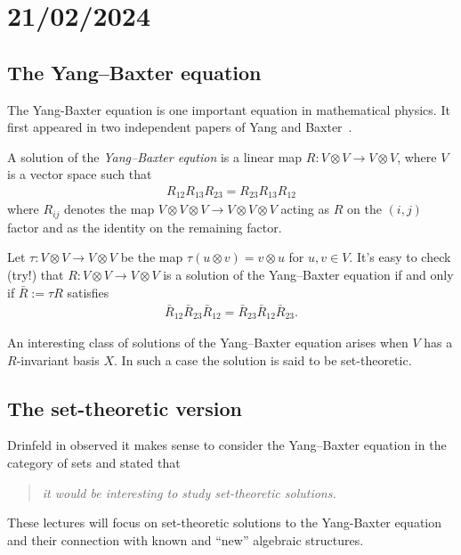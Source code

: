 \section{21/02/2024}

\subsection{The Yang--Baxter equation}
The Yang-Baxter equation is one important equation in mathematical physics.
It first appeared in two independent papers of Yang \cite{Yang1967} and Baxter\
\cite{Baxter1971}.

\begin{definition}
    A solution of the \emph{Yang--Baxter eqution} is a linear map  $R: V\otimes V \to V \otimes V$, where $V$ is a vector space such that
    \begin{align*}
        R_{12}R_{13}R_{23} = R_{23}R_{13}R_{12}
    \end{align*}
    where $R_{ij}$ denotes the map $V\otimes V\otimes V \to V \otimes V \otimes V$ acting as $R$ on the $(i,j)$
    factor and as the identity on the remaining factor.
\end{definition}
    Let $\tau: V\otimes V \to V \otimes V$ be the map $\tau(u\otimes v) = v \otimes u$ for $u,v \in V$.
    It's easy to check (try!) that $R: V \otimes V \to V \otimes V$ is a solution of the Yang--Baxter equation if and only if $\bar{R}:=\tau R$ satisfies 
    \begin{align*}
        \bar{R}_{12}\bar{R}_{23}\bar{R}_{12}=\bar{R}_{23}\bar{R}_{12}\bar{R}_{23}.
    \end{align*}

    An interesting class of solutions of the Yang--Baxter equation arises when $V$ has a $R$-invariant basis $X$. In such a case the solution is said to be set-theoretic. 

\subsection{The set-theoretic version}
    Drinfeld in \cite{Dri1992} observed it makes sense to consider the Yang--Baxter equation in the category of sets and stated that 

    
    \begin{quote}\textit{it would be interesting to study set-theoretic solutions.}\end{quote}
    

    These lectures will focus on set-theoretic solutions to the Yang-Baxter equation and their connection with known and ``new'' algebraic structures. 

